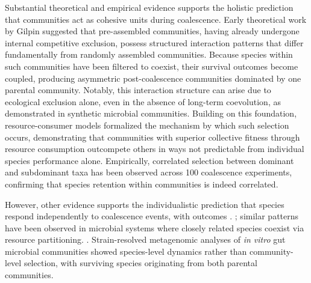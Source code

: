 Substantial theoretical and empirical evidence supports the holistic prediction that communities act as cohesive units during coalescence. Early theoretical work by Gilpin\citep{Gilpin1994} suggested that pre-assembled communities, having already undergone internal competitive exclusion, possess structured interaction patterns that differ fundamentally from randomly assembled communities. Because species within such communities have been filtered to coexist, their survival outcomes become coupled, producing asymmetric post-coalescence communities dominated by one parental community\citep{Debray2022}. Notably, this interaction structure can arise due to ecological exclusion alone, even in the absence of long-term coevolution, as demonstrated in synthetic microbial communities\citep{Venturelli2018, Maynard2020}. Building on this foundation, resource-consumer models formalized the mechanism by which such selection occurs, demonstrating that communities with superior collective fitness through resource consumption outcompete others in ways not predictable from individual species performance alone\citep{Tikhonov2016, Lechon2021, Xie2019, Xie2021}. Empirically, correlated selection between dominant and subdominant taxa has been observed across 100 coalescence experiments, confirming that species retention within communities is indeed correlated\citep{DiazColunga2022}. 

However, other evidence supports the individualistic prediction that species respond independently to coalescence events, with outcomes . \citep{Vermeij1991}; similar patterns have been observed in microbial systems where closely related species coexist via resource partitioning\citep{Brochet2021}. \citep{VanderGucht2007}. Strain-resolved metagenomic analyses of \textit{in vitro} gut microbial communities showed species-level dynamics rather than community-level selection, with surviving species originating from both parental communities\citep{Goldman2025, Walton2025}. 

